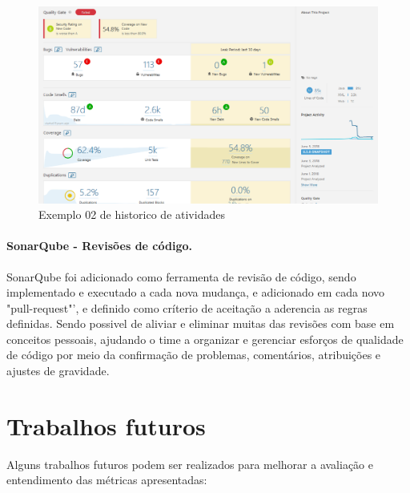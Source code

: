 \documentclass[12pt]{article}
\begin{document}
\begin{figure}[H]
	\centering
		\includegraphics[scale=0.5]{img/sonar-overview-PMD.png}
	\caption{Exemplo 02 de historico de atividades}
	\label{fig:sonar-overview-PMD}
\end{figure}



\subsection{SonarQube - Revisões de código.} \label{sec:sonar-review}

SonarQube foi adicionado como ferramenta de revisão de código, sendo implementado e executado a cada nova mudança, e adicionado em cada novo "pull-request"', e definido como críterio de aceitação a aderencia as regras definidas.
Sendo possivel de aliviar e eliminar muitas das revisões com base em conceitos pessoais, ajudando o time a organizar e gerenciar esforços de qualidade de código por meio da confirmação de problemas, comentários, atribuições e ajustes de gravidade. 

\newpage
\part{Trabalhos futuros} \label{sec:trabalhos_futuros}

Alguns trabalhos futuros podem ser realizados para melhorar a avaliação e entendimento das métricas apresentadas:
\end{document}
